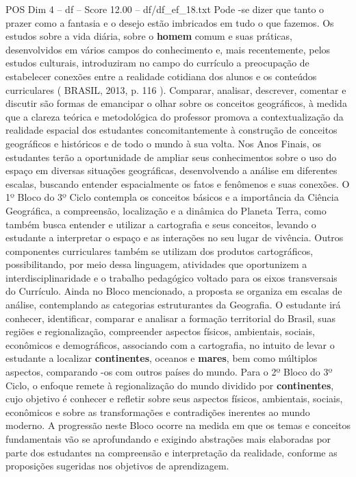 \begin{textsample}{POS Dim 4 – df – Score 12.00 – df/df\_ef\_18.txt}
Pode -se dizer que tanto o prazer como a fantasia e o desejo estão imbricados em tudo o que fazemos.
Os estudos sobre a vida diária, sobre o \textbf{homem} comum e suas práticas, desenvolvidos em vários campos do conhecimento e, mais recentemente, pelos estudos culturais, introduziram no campo do currículo a preocupação de estabelecer conexões entre a realidade cotidiana dos alunos e os conteúdos curriculares ( BRASIL, 2013, p. 116 ).
Comparar, analisar, descrever, comentar e discutir são formas de emancipar o olhar sobre os conceitos geográficos, à medida que a clareza teórica e metodológica do professor promova a contextualização da realidade espacial dos estudantes concomitantemente à construção de conceitos geográficos e históricos e de todo o mundo à sua volta.
Nos Anos Finais, os estudantes terão a oportunidade de ampliar seus conhecimentos sobre o uso do espaço em diversas situações geográficas, desenvolvendo a análise em diferentes escalas, buscando entender espacialmente os fatos e fenômenos e suas conexões.
O 1º Bloco do 3º Ciclo contempla os conceitos básicos e a importância da Ciência Geográfica, a compreensão, localização e a dinâmica do Planeta Terra, como também busca entender e utilizar a cartografia e seus conceitos, levando o estudante a interpretar o espaço e as interações no seu lugar de vivência.
Outros componentes curriculares também se utilizam dos produtos cartográficos, possibilitando, por meio dessa linguagem, atividades que oportunizem a interdisciplinaridade e o trabalho pedagógico voltado para os eixos transversais do Currículo.
Ainda no Bloco mencionado, a proposta se organiza em escalas de análise, contemplando as categorias estruturantes da Geografia.
O estudante irá conhecer, identificar, comparar e analisar a formação territorial do Brasil, suas regiões e regionalização, compreender aspectos físicos, ambientais, sociais, econômicos e demográficos, associando com a cartografia, no intuito de levar o estudante a localizar \textbf{continentes}, oceanos e \textbf{mares}, bem como múltiplos aspectos, comparando -os com outros países do mundo.
Para o 2º Bloco do 3º Ciclo, o enfoque remete à regionalização do mundo dividido por \textbf{continentes}, cujo objetivo é conhecer e refletir sobre seus aspectos físicos, ambientais, sociais, econômicos e sobre as transformações e contradições inerentes ao mundo moderno.
A progressão neste Bloco ocorre na medida em que os temas e conceitos fundamentais vão se aprofundando e exigindo abstrações mais elaboradas por parte dos estudantes na compreensão e interpretação da realidade, conforme as proposições sugeridas nos objetivos de aprendizagem.

\end{textsample}
